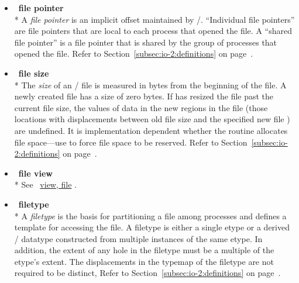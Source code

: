 \begin{itemize}
\label{glossary:file_pointer}
\item  ~\hypertarget{glossary:file_pointer}{\textbf{file pointer}} \\*
A {\it file pointer} is an implicit offset maintained by \MPI/.
``Individual file pointers'' are file pointers that are local to
each process that opened the file.
A ``shared file pointer'' is a file pointer that is shared by
the group of processes that opened the file.
Refer to Section~\ref{subsec:io-2:definitions} on page~\pageref{subsec:io-2:definitions}.

\label{glossary:file_size}
\item  ~\hypertarget{glossary:file_size}{\textbf{file size}} \\*
The {\it size} of an \MPI/ file is measured in bytes from the 
beginning of the file.  A newly created file has a size of zero 
bytes.  
If  has resized the file past the
current file size, the values of data in the new regions in the file (those
locations with displacements between old file size and the specified new file \textbf{})
are undefined.
It is implementation dependent whether the  routine
allocates file space---use 
to force file space to be reserved.
Refer to Section~\ref{subsec:io-2:definitions} on page~\pageref{subsec:io-2:definitions}.

\label{glossary:file_view}
\item  ~\hypertarget{glossary:file_view}{\textbf{file view}} \\*
See ~\hyperlink{glossary:view_file}{view, file} .

\label{glossary:filetype}
\item  ~\hypertarget{glossary:filetype}{\textbf{filetype}} \\*
A {\it filetype} is the basis for partitioning a file among processes
and defines a template for accessing the file.
A filetype is either a single etype or a derived \MPI/ datatype
constructed from multiple instances of the same etype.
In addition,
the extent of any hole in the filetype
must be a multiple of the etype's extent.
The displacements in the typemap of the filetype are not required to be distinct,
Refer to Section~\ref{subsec:io-2:definitions} on page~\pageref{subsec:io-2:definitions}.


\end{itemize}
